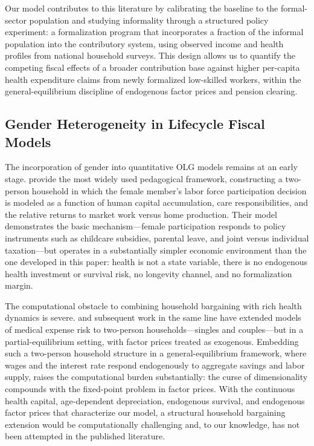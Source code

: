 \documentclass[12pt,a4paper]{article}
\begin{document}
Our model contributes to this literature by calibrating the baseline to the formal-sector population and studying informality through a structured policy experiment: a formalization program that incorporates a fraction of the informal population into the contributory system, using observed income and health profiles from national household surveys. This design allows us to quantify the competing fiscal effects of a broader contribution base against higher per-capita health expenditure claims from newly formalized low-skilled workers, within the general-equilibrium discipline of endogenous factor prices and pension clearing.

\subsection{Gender Heterogeneity in Lifecycle Fiscal Models}
\label{subsec:lit_gender}

The incorporation of gender into quantitative OLG models remains at an early stage. \citet{FehrKindermann2018} provide the most widely used pedagogical framework, constructing a two-person household in which the female member's labor force participation decision is modeled as a function of human capital accumulation, care responsibilities, and the relative returns to market work versus home production. Their model demonstrates the basic mechanism---female participation responds to policy instruments such as childcare subsidies, parental leave, and joint versus individual taxation---but operates in a substantially simpler economic environment than the one developed in this paper: health is not a state variable, there is no endogenous health investment or survival risk, no longevity channel, and no formalization margin.

The computational obstacle to combining household bargaining with rich health dynamics is severe. \citet{DeNardi2010} and subsequent work in the same line have extended models of medical expense risk to two-person households---singles and couples---but in a partial-equilibrium setting, with factor prices treated as exogenous. Embedding such a two-person household structure in a general-equilibrium framework, where wages and the interest rate respond endogenously to aggregate savings and labor supply, raises the computational burden substantially: the curse of dimensionality compounds with the fixed-point problem in factor prices. With the continuous health capital, age-dependent depreciation, endogenous survival, and endogenous factor prices that characterize our model, a structural household bargaining extension would be computationally challenging and, to our knowledge, has not been attempted in the published literature.
\end{document}
